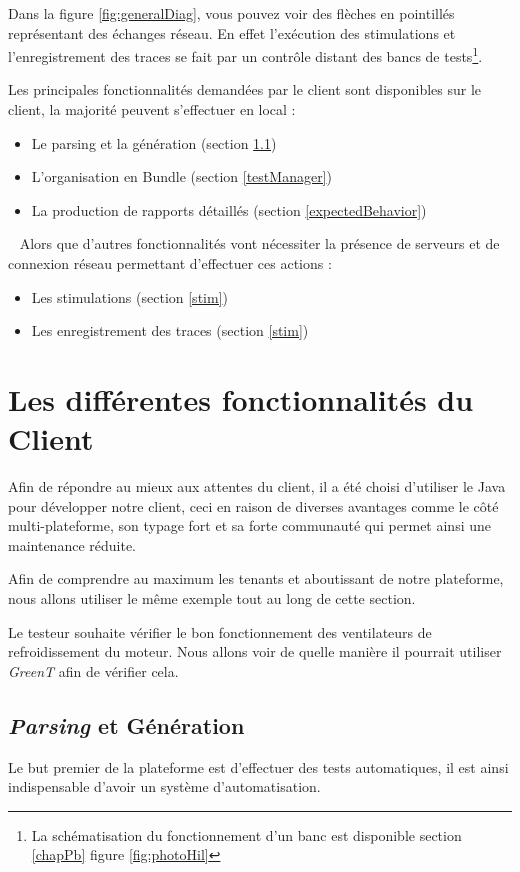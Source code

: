 Dans la figure \ref{fig:generalDiag}, vous pouvez voir des flèches en pointillés représentant des échanges réseau. En effet
l'exécution des stimulations et l'enregistrement des traces se fait par un contrôle distant des bancs de tests\footnote{La
	schématisation du fonctionnement d'un banc est disponible section \ref{chapPb} figure \ref{fig:photoHil}}.

Les principales fonctionnalités demandées par le client sont disponibles sur le client, la majorité peuvent s'effectuer en local : 
\begin{itemize}
	\item Le parsing et la génération (section \ref{generation})
	\item L'organisation en Bundle (section \ref{testManager})
	\item La production de rapports détaillés (section \ref{expectedBehavior})
\end{itemize}~\newline
Alors que d'autres fonctionnalités vont nécessiter la présence de serveurs et de connexion réseau permettant d'effectuer ces actions
: 
\begin{itemize}
	\item Les stimulations (section \ref{stim})
	\item Les enregistrement des traces (section \ref{stim})
\end{itemize}

\section{Les différentes fonctionnalités du Client}
Afin de répondre au mieux aux attentes du client, il a été choisi d'utiliser le Java pour développer notre client, ceci en raison de
diverses avantages comme le côté multi-plateforme, son typage fort et sa forte communauté qui permet ainsi une maintenance réduite. 

\begin{exemple}
Afin de comprendre au maximum les tenants et aboutissant de notre plateforme, nous allons utiliser le même exemple tout au long de cette section.

Le testeur souhaite vérifier le bon fonctionnement des ventilateurs de refroidissement du moteur. Nous allons voir de quelle manière il pourrait utiliser \textit{GreenT} afin de vérifier cela.
\end{exemple}

\subsection{\textit{Parsing} et Génération}\label{generation}
Le but premier de la plateforme est d'effectuer des tests automatiques, il est ainsi indispensable d'avoir un système d'automatisation.

